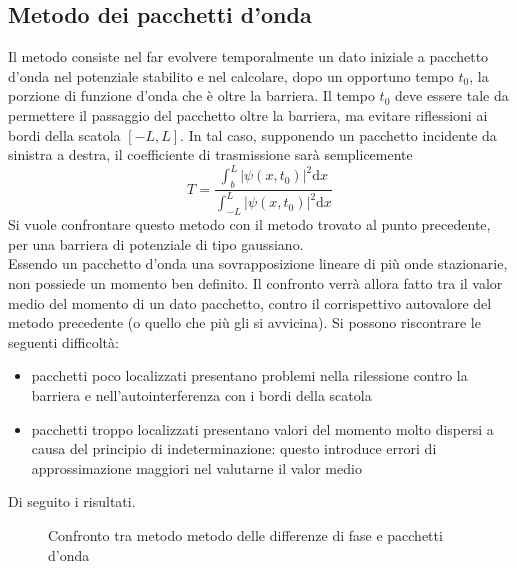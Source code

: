 \subsection*{Metodo dei pacchetti d'onda}
Il metodo consiste nel far evolvere temporalmente un dato iniziale a pacchetto
d'onda nel potenziale stabilito e nel calcolare, dopo un opportuno tempo $t_0$,
la porzione di funzione d'onda che è oltre la barriera. Il tempo $t_0$ deve essere tale
da permettere il passaggio del pacchetto oltre la barriera, ma evitare riflessioni
ai bordi della scatola $[-L,L]$.
In tal caso, supponendo un pacchetto incidente da sinistra a destra,
il coefficiente di trasmissione sarà semplicemente
    $$ T = \frac{\int_b^L |\psi(x,t_0)|^2\mathrm d x}{\int_{-L}^L |\psi(x,t_0)|^2\mathrm d x} $$
Si vuole confrontare questo metodo con il metodo trovato al punto precedente,
per una barriera di potenziale di tipo gaussiano.\\
Essendo un pacchetto d'onda una sovrapposizione lineare di più onde stazionarie,
non possiede un momento ben definito. Il confronto verrà allora fatto tra il valor medio
del momento di un dato pacchetto, contro il corrispettivo autovalore
del metodo precedente (o quello che più gli si avvicina).
Si possono riscontrare le seguenti difficoltà:
\begin{itemize}
    \item pacchetti poco localizzati presentano problemi nella rilessione contro la barriera
    e nell'autointerferenza con i bordi della scatola
    \item pacchetti troppo localizzati presentano valori del momento
    molto dispersi a causa del principio di indeterminazione:
    questo introduce errori di approssimazione maggiori nel valutarne il valor medio
\end{itemize}
\bigskip
Di seguito i risultati.
\\

\begin{figure}[h]
	\begin{subfigure}
		{
			\texttt{[image: tr\_coeff\_gauss1.eps]}
		}
	\end{subfigure}
	\begin{subfigure}
		{
			\texttt{[image: tr\_coeff\_gauss2.eps]}
		}
	\end{subfigure}
	\caption{Confronto tra metodo metodo delle differenze di fase e pacchetti d'onda}
\end{figure}



